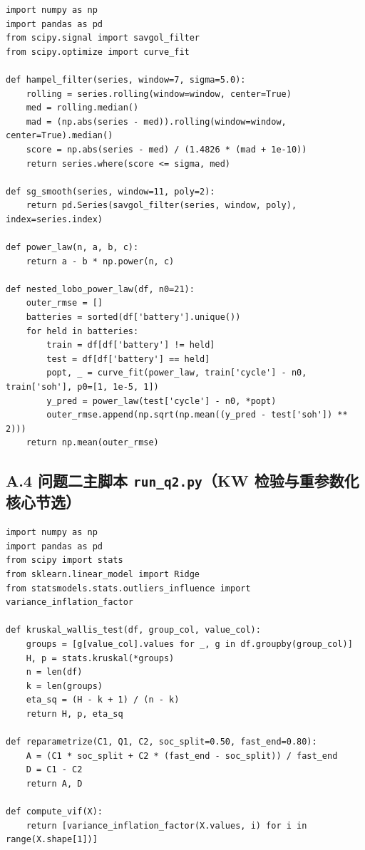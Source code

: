 \documentclass[12pt,a4paper]{article}
\begin{document}
\begin{appendices}
\begin{lstlisting}[caption={问题一：Hampel 清洗与幂律寿命建模},label={lst:q1}]
import numpy as np
import pandas as pd
from scipy.signal import savgol_filter
from scipy.optimize import curve_fit

def hampel_filter(series, window=7, sigma=5.0):
    rolling = series.rolling(window=window, center=True)
    med = rolling.median()
    mad = (np.abs(series - med)).rolling(window=window, center=True).median()
    score = np.abs(series - med) / (1.4826 * (mad + 1e-10))
    return series.where(score <= sigma, med)

def sg_smooth(series, window=11, poly=2):
    return pd.Series(savgol_filter(series, window, poly), index=series.index)

def power_law(n, a, b, c):
    return a - b * np.power(n, c)

def nested_lobo_power_law(df, n0=21):
    outer_rmse = []
    batteries = sorted(df['battery'].unique())
    for held in batteries:
        train = df[df['battery'] != held]
        test = df[df['battery'] == held]
        popt, _ = curve_fit(power_law, train['cycle'] - n0, train['soh'], p0=[1, 1e-5, 1])
        y_pred = power_law(test['cycle'] - n0, *popt)
        outer_rmse.append(np.sqrt(np.mean((y_pred - test['soh']) ** 2)))
    return np.mean(outer_rmse)
\end{lstlisting}

\subsection*{A.4 问题二主脚本 \texttt{run\_q2.py}（KW 检验与重参数化核心节选）}

\begin{lstlisting}[caption={问题二：Kruskal-Wallis 检验与 A/D 重参数化},label={lst:q2}]
import numpy as np
import pandas as pd
from scipy import stats
from sklearn.linear_model import Ridge
from statsmodels.stats.outliers_influence import variance_inflation_factor

def kruskal_wallis_test(df, group_col, value_col):
    groups = [g[value_col].values for _, g in df.groupby(group_col)]
    H, p = stats.kruskal(*groups)
    n = len(df)
    k = len(groups)
    eta_sq = (H - k + 1) / (n - k)
    return H, p, eta_sq

def reparametrize(C1, Q1, C2, soc_split=0.50, fast_end=0.80):
    A = (C1 * soc_split + C2 * (fast_end - soc_split)) / fast_end
    D = C1 - C2
    return A, D

def compute_vif(X):
    return [variance_inflation_factor(X.values, i) for i in range(X.shape[1])]


\end{lstlisting}
\end{appendices}
\end{document}

